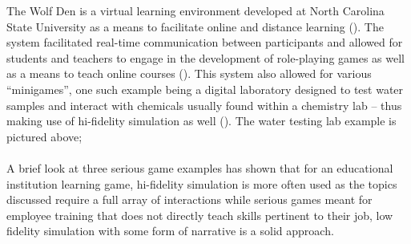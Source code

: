 The Wolf Den is a virtual learning environment developed at North Carolina State University as a means to facilitate online and distance learning (\cite{Annetta2008}). The system facilitated real-time communication between participants and allowed for students and teachers to engage in the development of role-playing games as well as a means to teach online courses (\cite{Annetta2008}). This system also allowed for various “minigames”, one such example being a digital laboratory designed to test water samples and interact with chemicals usually found within a chemistry lab – thus making use of hi-fidelity simulation as well (\cite{Annetta2008}).  The water testing lab example is pictured above;
\\\\
A brief look at three serious game examples has shown that for an educational institution learning game, hi-fidelity simulation is more often used as the topics discussed require a full array of interactions while serious games meant for employee training that does not directly teach skills pertinent to their job, low fidelity simulation with some form of narrative is a solid approach.

